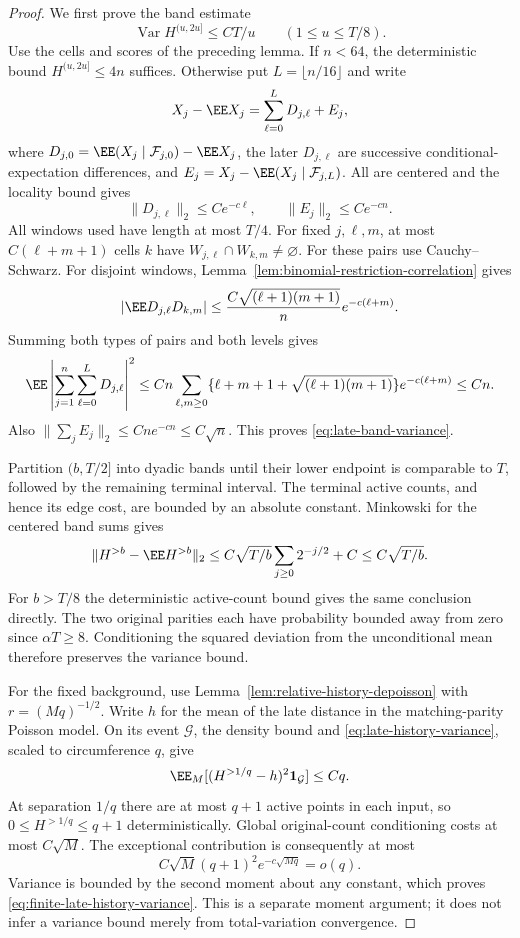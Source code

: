 \documentclass[11pt,letterpaper]{article}
\newcommand{\ind}{\mathbf 1}\newcommand{\Exp}{\operatorname{Exp}}
\begin{document}
\begin{proof}
We first prove the band estimate
\begin{equation}\label{eq:late-band-variance}
 \operatorname{Var}H^{(u,2u]}\le CT/u
                    \qquad(1\le u\le T/8).
\end{equation}
Use the cells and scores of the preceding lemma. If $n<64$,
the deterministic bound $H^{(u,2u]}\le4n$ suffices.
Otherwise put $L=\lfloor n/16\rfloor$ and write
\[
 X_j-\EE X_j=\sum_{\ell=0}^L D_{j,\ell}+E_j,
\]
where $D_{j,0}=\EE(X_j\mid\mathcal F_{j,0})-\EE X_j$,
the later $D_{j,\ell}$ are successive conditional-expectation
differences, and $E_j=X_j-\EE(X_j\mid\mathcal F_{j,L})$.
All are centered and the locality bound gives
\[
 \|D_{j,\ell}\|_2\le Ce^{-c\ell},\qquad
 \|E_j\|_2\le Ce^{-cn}.
\]
All windows used have length at most $T/4$.
For fixed $j,\ell,m$, at most $C(\ell+m+1)$ cells $k$
have $W_{j,\ell}\cap W_{k,m}\ne\varnothing$.
For these pairs use Cauchy--Schwarz. For disjoint windows,
Lemma~\ref{lem:binomial-restriction-correlation} gives
\[
 |\EE D_{j,\ell}D_{k,m}|
 \le \frac{C\sqrt{(\ell+1)(m+1)}}{n}
                        e^{-c(\ell+m)}.
\]
Summing both types of pairs and both levels gives
\[
 \EE\left|\sum_{j=1}^n\sum_{\ell=0}^L D_{j,\ell}\right|^2
 \le Cn\sum_{\ell,m\ge0}
       \{\ell+m+1+\sqrt{(\ell+1)(m+1)}\}e^{-c(\ell+m)}
 \le Cn.
\]
Also $\|\sum_jE_j\|_2\le Cn e^{-cn}\le C\sqrt n$.
This proves \eqref{eq:late-band-variance}.

Partition $(b,T/2]$ into dyadic bands until their lower
endpoint is comparable to $T$, followed by the remaining
terminal interval. The terminal active counts, and hence
its edge cost, are bounded by an absolute constant.
Minkowski for the centered band sums gives
\[
 \|H^{>b}-\EE H^{>b}\|_2
       \le C\sqrt{T/b}\sum_{j\ge0}2^{-j/2}+C
       \le C\sqrt{T/b}.
\]
For $b>T/8$ the deterministic active-count bound gives the
same conclusion directly. The two original parities each
have probability bounded away from zero since $\alpha T\ge8$.
Conditioning the squared deviation from the unconditional
mean therefore preserves the variance bound.

For the fixed background, use
Lemma~\ref{lem:relative-history-depoisson} with
$r=(Mq)^{-1/2}$. Write $h$ for the mean of the late distance
in the matching-parity Poisson model. On its event
$\mathcal G$, the density bound and
\eqref{eq:late-history-variance}, scaled to circumference $q$,
give
\[
 \EE_M[(H^{>1/q}-h)^2\ind_{\mathcal G}]\le Cq.
\]
At separation $1/q$ there are at most $q+1$ active points
in each input, so $0\le H^{>1/q}\le q+1$ deterministically.
Global original-count conditioning costs at most $C\sqrt M$.
The exceptional contribution is consequently at most
\[
 C\sqrt M(q+1)^2e^{-c\sqrt{Mq}}=o(q).
\]
Variance is bounded by the second moment about any constant,
which proves \eqref{eq:finite-late-history-variance}.
This is a separate moment argument; it does not infer a
variance bound merely from total-variation convergence.
\end{proof}
\end{document}
